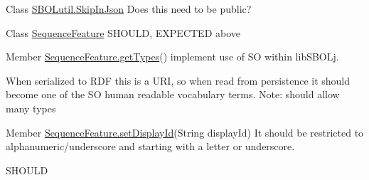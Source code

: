 \label{todo__todo000006}
\hypertarget{todo__todo000006}{}
 
\begin{DoxyDescription}
\item[Class \hyperlink{interfaceorg_1_1sbolstandard_1_1lib_s_b_o_lj_1_1_s_b_o_lutil_1_1_skip_in_json}{SBOLutil.SkipInJson} ]Does this need to be public?
\end{DoxyDescription}

\label{todo__todo000007}
\hypertarget{todo__todo000007}{}
 
\begin{DoxyDescription}
\item[Class \hyperlink{classorg_1_1sbolstandard_1_1lib_s_b_o_lj_1_1_sequence_feature}{SequenceFeature} ]SHOULD, EXPECTED above
\end{DoxyDescription}

\label{todo__todo000009}
\hypertarget{todo__todo000009}{}
 
\begin{DoxyDescription}
\item[Member \hyperlink{classorg_1_1sbolstandard_1_1lib_s_b_o_lj_1_1_sequence_feature_a518b97368db3de477d5fb57150d8b711}{SequenceFeature.getTypes}() ]implement use of SO within libSBOLj. 

When serialized to RDF this is a URI, so when read from persistence it should become one of the SO human readable vocabulary terms. Note: should allow many types 
\end{DoxyDescription}

\label{todo__todo000008}
\hypertarget{todo__todo000008}{}
 
\begin{DoxyDescription}
\item[Member \hyperlink{classorg_1_1sbolstandard_1_1lib_s_b_o_lj_1_1_sequence_feature_a46b93a70e7bd612a7b429aac4829bc88}{SequenceFeature.setDisplayId}(String displayId) ]It should be restricted to alphanumeric/underscore and starting with a letter or underscore. 

SHOULD 
\end{DoxyDescription}